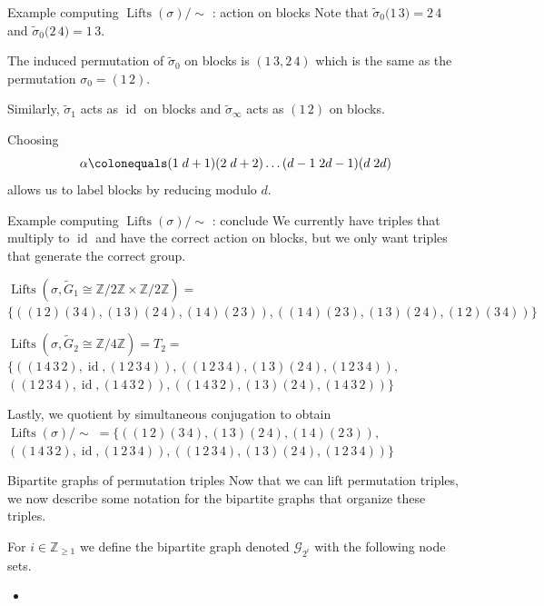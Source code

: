 \documentclass[handout,xcolor=dvipsnames]{beamer}
\theoremstyle{plain}
\newcommand{\ZZ}{\mathbb Z}
\newcommand{\wt}[1]{\widetilde{#1}}
\DeclareMathOperator{\Lifts}{Lifts}
\DeclareMathOperator{\id}{id}
\begin{document}
{\begin{frame}{Example computing $\Lifts(\sigma)/\!\!\sim$ : action on blocks}
      Note that
      $\wt{\sigma}_0\Big(\boxed{1\,3}\Big) = \boxed{2\,4}$
      and
      $\wt{\sigma}_0\Big(\boxed{2\,4}\Big) = \boxed{1\,3}$.
      \pause\par
      The induced permutation
      of $\wt{\sigma}_0$ on blocks is
      $\left(\boxed{1\,3},\boxed{2\,4}\right)$
      which is the same as the
      permutation $\sigma_0 = (1\,2)$.
      \pause\par
      Similarly,
      $\wt{\sigma}_1$ acts as $\id$ on blocks
      and $\wt{\sigma}_\infty$ acts
      as $(1\,2)$ on blocks.
      \pause\par
      Choosing
      \[
        \alpha\colonequals
        (1\;d+1)(2\;d+2)\dots
        (d-1\;2d-1)(d\;2d)
      \]
      allows us to label blocks by reducing modulo $d$.
    \end{frame}
    \begin{frame}{Example computing $\Lifts(\sigma)/\!\!\sim$ : conclude}
      We currently have triples that multiply to $\id$
      and have the correct action on blocks,
      but we only want triples that
      generate the correct group.
      \pause\par
      $\Lifts(\sigma,\wt{G}_1\cong\ZZ/2\ZZ\times\ZZ/2\ZZ)=$
      $\Big\{ ((1\,2)(3\,4), (1\,3)(2\,4), (1\,4)(2\,3)),
      ((1\,4)(2\,3), (1\,3)(2\,4), (1\,2)(3\,4)) \Big\}$
      \pause\par
      $\Lifts(\sigma,\wt{G}_2\cong\ZZ/4\ZZ)=T_2=$
      $\Big\{ ((1\,4\,3\,2), \id, (1\,2\,3\,4)),
      ((1\,2\,3\,4), (1\,3)(2\,4), (1\,2\,3\,4)),$
      $((1\,2\,3\,4), \id, (1\,4\,3\,2)),
      ((1\,4\,3\,2), (1\,3)(2\,4), (1\,4\,3\,2)) \Big\}$
      \pause\par
      Lastly, we quotient by simultaneous conjugation to obtain
      $\Lifts(\sigma)/\!\!\sim \;=\Big\{
      ((1\,2)(3\,4),(1\,3)(2\,4),(1\,4)(2\,3)),$
      $((1\,4\,3\,2),\id,(1\,2\,3\,4)),
      ((1\,2\,3\,4),(1\,3)(2\,4),(1\,2\,3\,4)) \Big\}$
    \end{frame}
    \begin{frame}{Bipartite graphs of permutation triples}
      Now that we can lift permutation triples,
      we now describe some notation for the bipartite
      graphs that organize these triples.
      \pause\par
      For $i\in\ZZ_{\geq 1}$ we define the bipartite
      graph denoted $\mathscr{G}_{2^i}$ with the following
      node sets.
      \begin{itemize}
        \item

\end{itemize}
\end{frame}}
\end{document}
